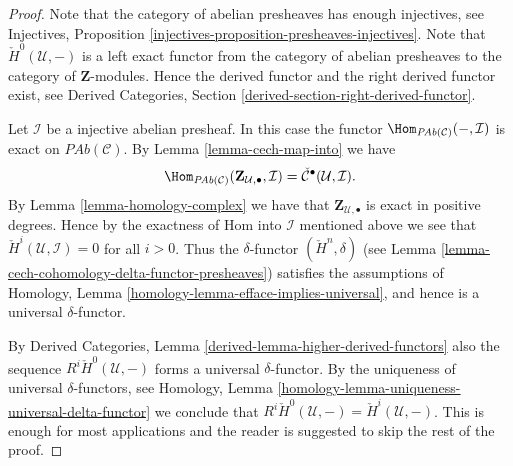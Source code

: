 \begin{proof}
Note that the category of abelian presheaves has enough injectives, see
Injectives, Proposition \ref{injectives-proposition-presheaves-injectives}.
Note that $\check{H}^0(\mathcal{U}, -)$ is a left exact functor
from the category of abelian presheaves
to the category of $\mathbf{Z}$-modules.
Hence the derived functor and the right derived functor exist, see
Derived Categories, Section \ref{derived-section-right-derived-functor}.

\medskip\noindent
Let $\mathcal{I}$ be a injective abelian presheaf.
In this case the functor
$\Hom_{\textit{PAb}(\mathcal{C})}(-, \mathcal{I})$
is exact on $\textit{PAb}(\mathcal{C})$. By
Lemma \ref{lemma-cech-map-into} we have
$$
\Hom_{\textit{PAb}(\mathcal{C})}(
\mathbf{Z}_{\mathcal{U}, \bullet}, \mathcal{I})
=
\check{\mathcal{C}}^\bullet(\mathcal{U}, \mathcal{I}).
$$
By Lemma \ref{lemma-homology-complex} we have that
$\mathbf{Z}_{\mathcal{U}, \bullet}$ is exact in positive degrees.
Hence by the exactness of Hom into $\mathcal{I}$ mentioned above we see
that $\check{H}^i(\mathcal{U}, \mathcal{I}) = 0$ for all
$i > 0$. Thus the $\delta$-functor $(\check{H}^n, \delta)$
(see Lemma \ref{lemma-cech-cohomology-delta-functor-presheaves})
satisfies the assumptions of
Homology, Lemma \ref{homology-lemma-efface-implies-universal},
and hence is a universal $\delta$-functor.

\medskip\noindent
By
Derived Categories, Lemma \ref{derived-lemma-higher-derived-functors}
also the sequence $R^i\check{H}^0(\mathcal{U}, -)$
forms a universal $\delta$-functor. By the uniqueness of universal
$\delta$-functors, see
Homology, Lemma \ref{homology-lemma-uniqueness-universal-delta-functor}
we conclude that
$R^i\check{H}^0(\mathcal{U}, -) = \check{H}^i(\mathcal{U}, -)$.
This is enough for most applications
and the reader is suggested to skip the rest of the proof.


\end{proof}
